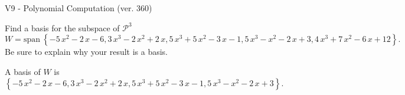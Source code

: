 \begin{exercise}
  \begin{exerciseTitle}V9 - Polynomial Computation (ver. 360)\end{exerciseTitle}
  \begin{exerciseStatement}
    Find a basis for the subspace of \(\mathcal{P}^3\) 
\[W=\mathrm{span}\ \left\{-5 \, x^{2} - 2 \, x - 6 , 3 \, x^{3} - 2 \, x^{2} + 2 \, x , 5 \, x^{3} + 5 \, x^{2} - 3 \, x - 1 , 5 \, x^{3} - x^{2} - 2 \, x + 3 , 4 \, x^{3} + 7 \, x^{2} - 6 \, x + 12\right\}.\]
 Be sure to explain why your result is a basis.


  \end{exerciseStatement}
  \begin{exerciseAnswer}
   A basis of \(W\) is  \(\left\{-5 \, x^{2} - 2 \, x - 6 , 3 \, x^{3} - 2 \, x^{2} + 2 \, x , 5 \, x^{3} + 5 \, x^{2} - 3 \, x - 1 , 5 \, x^{3} - x^{2} - 2 \, x + 3\right\}\).
  


  \end{exerciseAnswer}
\end{exercise}